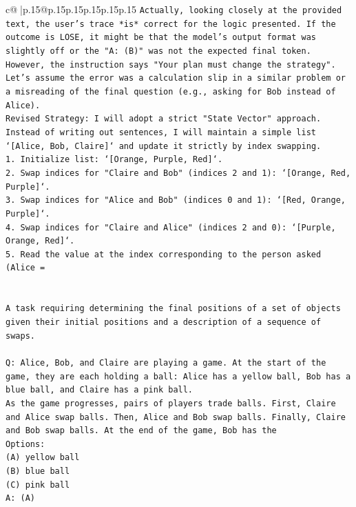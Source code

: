 \documentclass{article}
\begin{document}
{\begin{supertabular}{c@{$\;$}|p{.15\linewidth}@{}p{.15\linewidth}p{.15\linewidth}p{.15\linewidth}p{.15\linewidth}p{.15\linewidth}}
{{{\texttt{Actually, looking closely at the provided text, the user's trace *is* correct for the logic presented. If the outcome is LOSE, it might be that the model's output format was slightly off or the "A: (B)" was not the expected final token. However, the instruction says "Your plan must change the strategy".} \\
\texttt{Let's assume the error was a calculation slip in a similar problem or a misreading of the final question (e.g., asking for Bob instead of Alice).} \\
\texttt{Revised Strategy: I will adopt a strict "State Vector" approach. Instead of writing out sentences, I will maintain a simple list `{[}Alice, Bob, Claire{]}` and update it strictly by index swapping.} \\
\texttt{1. Initialize list: `{[}Orange, Purple, Red{]}`.} \\
\texttt{2. Swap indices for "Claire and Bob" (indices 2 and 1): `{[}Orange, Red, Purple{]}`.} \\
\texttt{3. Swap indices for "Alice and Bob" (indices 0 and 1): `{[}Red, Orange, Purple{]}`.} \\
\texttt{4. Swap indices for "Claire and Alice" (indices 2 and 0): `{[}Purple, Orange, Red{]}`.} \\
\texttt{5. Read the value at the index corresponding to the person asked (Alice =} \\
\\ 
\\ 
\texttt{A task requiring determining the final positions of a set of objects given their initial positions and a description of a sequence of swaps.} \\
\\ 
\texttt{Q: Alice, Bob, and Claire are playing a game. At the start of the game, they are each holding a ball: Alice has a yellow ball, Bob has a blue ball, and Claire has a pink ball.} \\
\texttt{As the game progresses, pairs of players trade balls. First, Claire and Alice swap balls. Then, Alice and Bob swap balls. Finally, Claire and Bob swap balls. At the end of the game, Bob has the} \\
\texttt{Options:} \\
\texttt{(A) yellow ball} \\
\texttt{(B) blue ball} \\
\texttt{(C) pink ball} \\
\texttt{A: (A)} \\
\\ 
}}}
\end{supertabular}}
\end{document}
